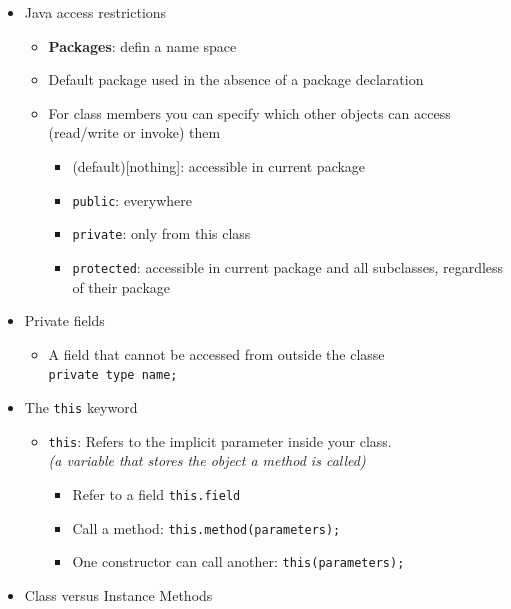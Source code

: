 \documentclass[a4paper]{article}
\newcommand{\inline}[1]{\lstinline!#1!}%
\begin{document}
\begin{itemize}
\begin{itemize}
\begin{itemize}
\begin{itemize}
							\end{itemize}
				\end{itemize}
		\end{itemize}
	\item Java access restrictions
		\begin{itemize}
			\item \textbf{Packages}: defin a name space
			\item Default package used in the absence of a package declaration
			\item For class members you can specify which other objects can access (read/write or invoke) them
				\begin{itemize}
					\item (default)[nothing]: accessible in current package
					\item \inline{public}: everywhere
					\item \inline{private}: only from this class
					\item \inline{protected}: accessible in current package and all subclasses, regardless of their package
				\end{itemize}
		\end{itemize}
	 \item Private fields
	 	\begin{itemize}
	 		\item A field that cannot be accessed from outside the classe\\
	 		\inline{private type name;}
	 	\end{itemize}
	 \item The \inline{this} keyword
	 	\begin{itemize}
	 		\item \inline{this}: Refers to the implicit parameter inside your class.\\\textit{(a variable that stores the object a method is called)}
	 			\begin{itemize}
	 				\item Refer to a field \inline{this.field}
	 				\item Call a method: \inline{this.method(parameters);}
	 				\item One constructor can call another: \inline{this(parameters);}
	 			\end{itemize}
	 	\end{itemize}
	 \item Class versus Instance Methods
	 	\begin{itemize}

\end{itemize}
\end{itemize}
\end{document}
